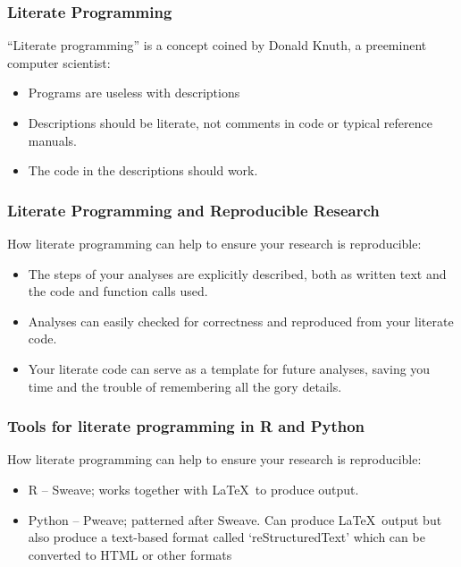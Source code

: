 \documentclass{beamer}
\begin{document}
\begin{frame}
  \frametitle{Literate Programming}

``Literate programming'' is a concept coined by Donald Knuth, a preeminent computer scientist:

\begin{itemize}

 \item Programs are useless with descriptions
 \item Descriptions should be literate, not comments in code or typical reference manuals. 
 \item The code in the descriptions should work.
\end{itemize}

\end{frame}

\begin{frame}
  \frametitle{Literate Programming and Reproducible Research}

How literate programming can help to ensure your research is reproducible:

\begin{itemize}

 \item The steps of your analyses are explicitly described, both as written text and the code and function calls used.
 \item Analyses can easily checked for correctness and reproduced from your literate code.
 \item Your literate code can serve as a template for future analyses, saving you time and the trouble of remembering all the gory details.
\end{itemize}

\end{frame}

\begin{frame}
  \frametitle{Tools for literate programming in R and Python}

How literate programming can help to ensure your research is reproducible:

\begin{itemize}

 \item R -- Sweave; works together with \LaTeX\ to produce output.
 \item Python -- Pweave; patterned after Sweave. Can produce \LaTeX\ output but also produce a text-based format called `reStructuredText' which can be converted to HTML or other formats
\end{itemize}
\end{frame}
\end{document}
